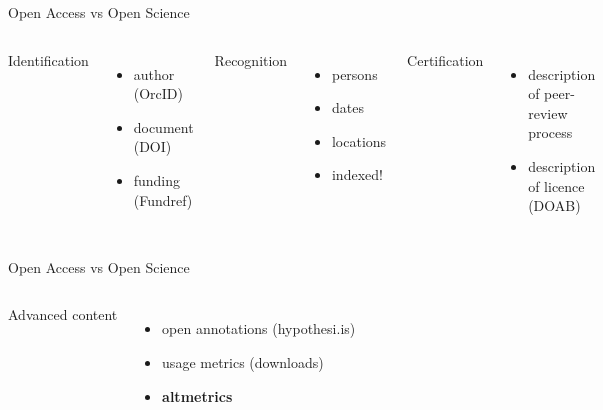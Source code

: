 \documentclass[xcolor=svgnames]{beamer}
\begin{document}
        \begin{frame}{Open Access vs Open Science}
            \vspace{0.05\textheight}
            \begin{columns}[c]
                    Identification 
                    \begin{itemize}
                        \item<2-> author (OrcID)
                        \item<3-> document (DOI)
                        \item<4-> funding (Fundref)
                    \end{itemize}
                    Recognition
                    \begin{itemize}
                        \item<5-> persons
                        \item<6-> dates
                        \item<7-> locations
                        \item<8-> indexed!
                    \end{itemize}
                    Certification
                    \begin{itemize}
                        \item<9-> description of peer-review process
                        \item<10-> description of licence (DOAB)
                    \end{itemize}
            \end{columns}
        \end{frame}

        \begin{frame}{Open Access vs Open Science}
            \begin{columns}[c]
                    Advanced content
                    \begin{itemize}
                        \item<2-> open annotations (hypothesi.is)
                        \item<3-> usage metrics (downloads)
                        \item<4-> \textbf{altmetrics}
                    \end{itemize}
            \end{columns}
        \end{frame}
\end{document}
